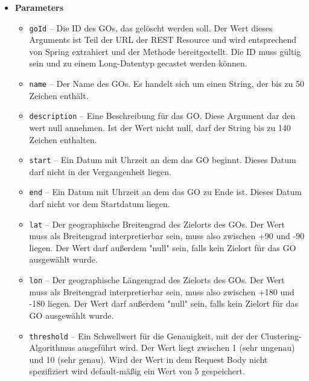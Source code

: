 \documentclass[11pt,a4paper]{article}
\begin{document}
{{{{{{{{{{{{{{{{{{{\begin{itemize}
{\begin{itemize}
{Diese Methode wird von einem Benutzer aufgerufen, wenn er die Daten eines GOs ändern will. Zu den Daten, die mit dieser Methode geändert werden können, gehören: - der GO-Name - die GO-Beschreibung - Der Anfangs- und Endzeitpunkt - Der Zielort - Der Clustering-Schwellwert Es ist garantiert, dass dieser Aufruf nur von einem Go-Verantwortlichen des zu ändernden GOs kommt. Der Aufruf dieser Methode entspricht einem HTTP PUT-Request an den Server an die URL \{Base\_URL\}/gos/\{goId\}. Abgesehen von der Go ID, können sämtliche Argumente dieser Methode den Wert null annehmen. Dies signalisiert der Methode, das der Wert nicht geändert wurde und die bisherigen Daten beibehalten werden sollen.
}
\item{
{\bf  Parameters}
  \begin{itemize}
   \item{
\texttt{goId} -- Die ID des GOs, das gelöscht werden soll. Der Wert dieses Arguments ist Teil der URL der REST Resource und wird entsprechend von Spring extrahiert und der Methode bereitgestellt. Die ID muss gültig sein und zu einem Long-Datentyp gecastet werden können.}
   \item{
\texttt{name} -- Der Name des GOs. Es handelt sich um einen String, der bis zu 50 Zeichen enthält.}
   \item{
\texttt{description} -- Eine Beschreibung für das GO. Diese Argument dar den wert null annehmen. Ist der Wert nicht null, darf der String bis zu 140 Zeichen enthalten.}
   \item{
\texttt{start} -- Ein Datum mit Uhrzeit an dem das GO beginnt. Dieses Datum darf nicht in der Vergangenheit liegen.}
   \item{
\texttt{end} -- Ein Datum mit Uhrzeit an dem das GO zu Ende ist. Dieses Datum darf nicht vor dem Startdatum liegen.}
   \item{
\texttt{lat} -- Der geographische Breitengrad des Zielorts des GOs. Der Wert muss als Breitengrad interpretierbar sein, muss also zwischen +90 und -90 liegen. Der Wert darf außerdem "null" sein, falls kein Zielort für das GO ausgewählt wurde.}
   \item{
\texttt{lon} -- Der geographische Längengrad des Zielorts des GOs. Der Wert muss als Breitengrad interpretierbar sein, muss also zwischen +180 und -180 liegen. Der Wert darf außerdem "null" sein, falls kein Zielort für das GO ausgewählt wurde.}
   \item{
\texttt{threshold} -- Ein Schwellwert für die Genauigkeit, mit der der Clustering-Algorithmus ausgeführt wird. Der Wert liegt zwischen 1 (sehr ungenau) und 10 (sehr genau). Wird der Wert in dem Request Body nicht spezifiziert wird default-mäßig ein Wert von 5 gespeichert.}

\end{itemize}}
\end{itemize}}
\end{itemize}}}}}}}}}}}}}}}}}}}}
\end{document}
